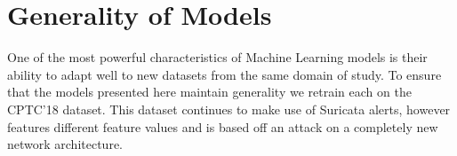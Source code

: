\section{Generality of Models}
\label{sec:cptc18}

One of the most powerful characteristics of Machine Learning models is their ability to adapt well to new datasets from the same domain of study. To ensure that the models presented here maintain generality we retrain each on the CPTC'18 dataset. This dataset continues to make use of Suricata alerts, however features different feature values and is based off an attack on a completely new network architecture. 
